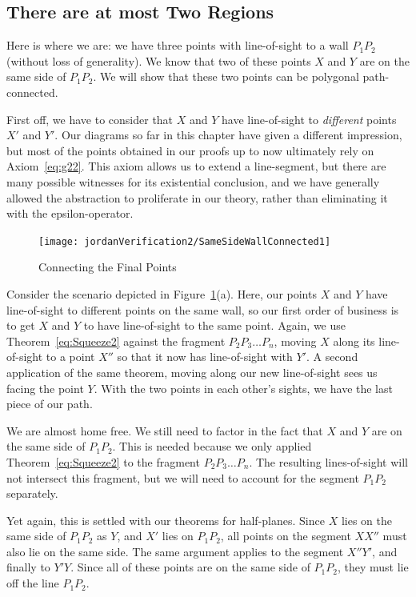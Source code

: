 \subsection{There are at most Two Regions}\label{sec:SameSideWallConnected}
Here is where we are: we have three points with line-of-sight to a wall $P_1P_2$ (without loss of generality). We know that two of these points $X$ and $Y$ are on the same side of $P_1P_2$. We will show that these two points can be polygonal path-connected.

First off, we have to consider that $X$ and $Y$ have line-of-sight to \emph{different} points $X'$ and $Y'$. Our diagrams so far in this chapter have given a different impression, but most of the points obtained in our proofs up to now ultimately rely on Axiom~\ref{eq:g22}. This axiom allows us to extend a line-segment, but there are many possible witnesses for its existential conclusion, and we have generally allowed the abstraction to proliferate in our theory, rather than eliminating it with the epsilon-operator. 

\begin{figure}
\centering\texttt{[image: jordanVerification2/SameSideWallConnected1]}
\caption{Connecting the Final Points}
\label{fig:SameSideWallConnected}
\end{figure}

Consider the scenario depicted in Figure~\ref{fig:SameSideWallConnected}(a). Here, our points $X$ and $Y$ have line-of-sight to different points on the same wall, so our first order of business is to get $X$ and $Y$ to have line-of-sight to the same point. Again, we use Theorem~\ref{eq:Squeeze2} against the fragment $P_2P_3\ldots P_n$, moving $X$ along its line-of-sight to a point $X''$ so that it now has line-of-sight with $Y'$. A second application of the same theorem, moving along our new line-of-sight sees us facing the point $Y$. With the two points in each other's sights, we have the last piece of our path.

We are almost home free. We still need to factor in the fact that $X$ and $Y$ are on the same side of $P_1P_2$. This is needed because we only applied Theorem~\ref{eq:Squeeze2} to the fragment $P_2P_3\ldots P_n$. The resulting lines-of-sight will not intersect this fragment, but we will need to account for the segment $P_1P_2$ separately.

Yet again, this is settled with our theorems for half-planes. Since $X$ lies on the same side of $P_1P_2$ as $Y$, and $X'$ lies on $P_1P_2$, all points on the segment $XX''$ must also lie on the same side. The same argument applies to the segment $X''Y'$, and finally to $Y'Y$. Since all of these points are on the same side of $P_1P_2$, they must lie off the line $P_1P_2$. 

